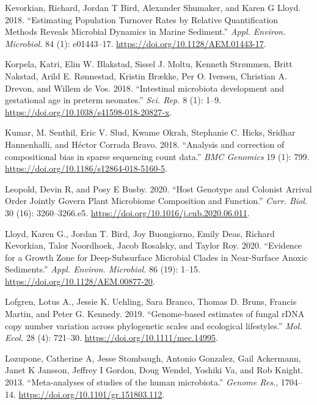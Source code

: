 \documentclass[
]{article}
\newlength{\cslhangindent}
\newlength{\cslentryspacingunit} %
\newenvironment{CSLReferences}[2] %
 {%
  \setlength{\parindent}{0pt}
  \ifodd #1
  \let\oldpar\par
  \def\par{\hangindent=\cslhangindent\oldpar}
  \fi
  \setlength{\parskip}{#2\cslentryspacingunit}
 }%
 {}
\begin{document}
\begin{CSLReferences}{1}{0}
\leavevmode{}%
Kevorkian, Richard, Jordan T Bird, Alexander Shumaker, and Karen G Lloyd. 2018. {``{Estimating Population Turnover Rates by Relative Quantification Methods Reveals Microbial Dynamics in Marine Sediment}.''} \emph{Appl. Environ. Microbiol.} 84 (1): e01443--17. \url{https://doi.org/10.1128/AEM.01443-17}.

\leavevmode{}%
Korpela, Katri, Elin W. Blakstad, Sissel J. Moltu, Kenneth Strømmen, Britt Nakstad, Arild E. Rønnestad, Kristin Brække, Per O. Iversen, Christian A. Drevon, and Willem de Vos. 2018. {``{Intestinal microbiota development and gestational age in preterm neonates}.''} \emph{Sci. Rep.} 8 (1): 1--9. \url{https://doi.org/10.1038/s41598-018-20827-x}.

\leavevmode{}%
Kumar, M. Senthil, Eric V. Slud, Kwame Okrah, Stephanie C. Hicks, Sridhar Hannenhalli, and Héctor Corrada Bravo. 2018. {``{Analysis and correction of compositional bias in sparse sequencing count data}.''} \emph{BMC Genomics} 19 (1): 799. \url{https://doi.org/10.1186/s12864-018-5160-5}.

\leavevmode{}%
Leopold, Devin R, and Posy E Busby. 2020. {``{Host Genotype and Colonist Arrival Order Jointly Govern Plant Microbiome Composition and Function}.''} \emph{Curr. Biol.} 30 (16): 3260--3266.e5. \url{https://doi.org/10.1016/j.cub.2020.06.011}.

\leavevmode{}%
Lloyd, Karen G., Jordan T. Bird, Joy Buongiorno, Emily Deas, Richard Kevorkian, Talor Noordhoek, Jacob Rosalsky, and Taylor Roy. 2020. {``{Evidence for a Growth Zone for Deep-Subsurface Microbial Clades in Near-Surface Anoxic Sediments}.''} \emph{Appl. Environ. Microbiol.} 86 (19): 1--15. \url{https://doi.org/10.1128/AEM.00877-20}.

\leavevmode{}%
Lofgren, Lotus A., Jessie K. Uehling, Sara Branco, Thomas D. Bruns, Francis Martin, and Peter G. Kennedy. 2019. {``{Genome‐based estimates of fungal rDNA copy number variation across phylogenetic scales and ecological lifestyles}.''} \emph{Mol. Ecol.} 28 (4): 721--30. \url{https://doi.org/10.1111/mec.14995}.

\leavevmode{}%
Lozupone, Catherine A, Jesse Stombaugh, Antonio Gonzalez, Gail Ackermann, Janet K Jansson, Jeffrey I Gordon, Doug Wendel, Yoshiki Va, and Rob Knight. 2013. {``{Meta-analyses of studies of the human microbiota}.''} \emph{Genome Res.}, 1704--14. \url{https://doi.org/10.1101/gr.151803.112}.


\end{CSLReferences}
\end{document}
